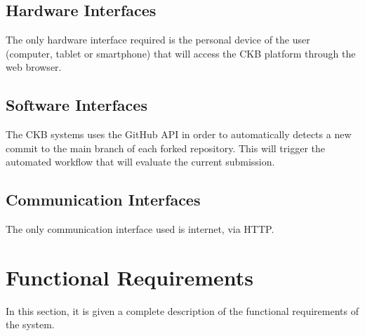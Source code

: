 \subsection{Hardware Interfaces}
The only hardware interface required is the personal device of the user (computer, tablet or smartphone) that will access the CKB platform through the web browser.
\subsection{Software Interfaces}
The CKB systems uses the GitHub API in order to automatically detects a new commit to the main branch of each forked repository. This will trigger the automated workflow that will evaluate the current submission.
\subsection{Communication Interfaces}
The only communication interface used is internet, via HTTP.
\clearpage

\section{Functional Requirements}
In this section, it is given a complete description of the functional requirements of the system.

